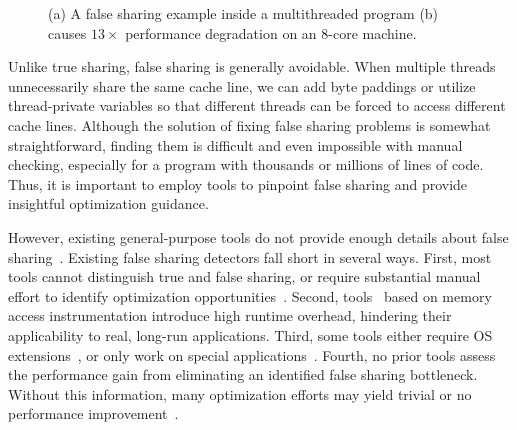 \begin{figure}[htbp]
\centering
{}%
\hspace{20pt}
\caption{
(a) A false sharing example inside a multithreaded program (b) causes $13\times$ performance degradation on an 8-core machine.
\label{fig:penalty}}
\end{figure}


Unlike true sharing, false sharing is generally avoidable. When multiple threads unnecessarily share the same cache line, we can add byte paddings or utilize thread-private variables so that different threads can be forced to access different cache lines. Although the solution of fixing false sharing problems is somewhat straightforward, finding them is difficult and even impossible with manual checking, especially for a program with thousands or millions of lines of code. Thus, it is important to employ tools to pinpoint false sharing and provide insightful optimization guidance.

However, existing general-purpose tools do not provide enough details about false sharing~\cite{gprof, ibs-sc, Intel:VTune}. Existing false sharing detectors fall short in several ways. First, most tools cannot distinguish true and false sharing, or require substantial manual effort to identify optimization opportunities~\cite{falseshare:binaryinstrumentation1,detect:ptu,detect:intel,falseshare:binaryinstrumentation2,DProf, OSdetection, mldetect, Wicaksono11detectingfalse, openmp}. Second, tools~\cite{falseshare:binaryinstrumentation1,falseshare:binaryinstrumentation2,falseshare:simulator, Predator, qinzhao} based on memory access instrumentation introduce high runtime overhead, hindering their applicability to real, long-run applications. Third, some tools either require OS  extensions~\cite{OSdetection}, or only work on special applications~\cite{Sheriff}. Fourth, no prior tools assess the performance gain from eliminating an identified false sharing bottleneck. Without this information, many optimization efforts may yield trivial or no performance improvement~\cite{Sheriff, qinzhao}.

